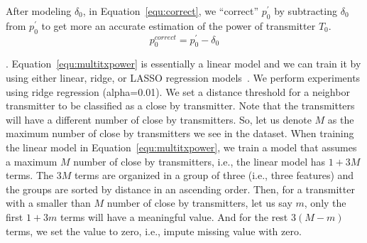 After modeling $\delta_0$, in Equation~\ref{equ:correct}, we ``correct'' $p_0^{'}$ by subtracting $\delta_0$ from $p_0^{'}$ to get more an accurate estimation of the power of transmitter $T_0$.
\begin{equation}
    p_{0}^{correct} = p_{0}^{'} - \delta_0
    \label{equ:correct}
\end{equation}

.
Equation~\ref{equ:multitxpower} is essentially a linear model and we can train it by using either linear, ridge, or LASSO regression models~\cite{scikit-learn}.
We perform experiments using ridge regression (alpha=0.01). 
We set a distance threshold for a neighbor transmitter to be classified as a close by transmitter. 
Note that the transmitters will have a different number of close by transmitters. 
So, let us denote $M$ as the maximum number of close by transmitters we see in the dataset.
When training the linear model in Equation~\ref{equ:multitxpower}, we train a model that assumes a maximum $M$ number of close by transmitters, i.e., the linear model has $1+3M$ terms.
The $3M$ terms are organized in a group of three (i.e., three features) and the groups are sorted by distance in an ascending order.
Then, for a transmitter with a smaller than $M$ number of close by transmitters, let us say $m$, only the first $1+3m$ terms will have a meaningful value.
And for the rest $3(M-m)$ terms, we set the value to zero, i.e., impute missing value with zero.
